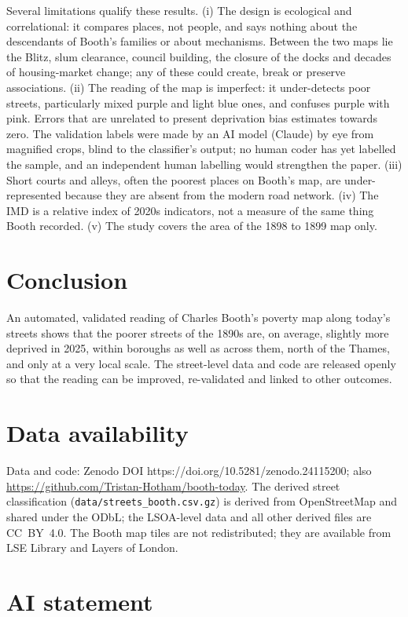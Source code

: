 Several limitations qualify these results. (i) The design is ecological and correlational: it compares places, not people, and says nothing about the descendants of Booth's families or about mechanisms. Between the two maps lie the Blitz, slum clearance, council building, the closure of the docks and decades of housing-market change; any of these could create, break or preserve associations. (ii) The reading of the map is imperfect: it under-detects poor streets, particularly mixed purple and light blue ones, and confuses purple with pink. Errors that are unrelated to present deprivation bias estimates towards zero. The validation labels were made by an AI model (Claude) by eye from magnified crops, blind to the classifier's output; no human coder has yet labelled the sample, and an independent human labelling would strengthen the paper. (iii) Short courts and alleys, often the poorest places on Booth's map, are under-represented because they are absent from the modern road network. (iv) The IMD is a relative index of 2020s indicators, not a measure of the same thing Booth recorded. (v) The study covers the area of the 1898 to 1899 map only.

\section{Conclusion}\label{sec:conclusion}

An automated, validated reading of Charles Booth's poverty map along today's streets shows that the poorer streets of the 1890s are, on average, slightly more deprived in 2025, within boroughs as well as across them, north of the Thames, and only at a very local scale. The street-level data and code are released openly so that the reading can be improved, re-validated and linked to other outcomes.

\section*{Data availability}
Data and code: Zenodo DOI https://doi.org/10.5281/zenodo.24115200; also \url{https://github.com/Tristan-Hotham/booth-today}. The derived street classification (\texttt{data/streets\_booth.csv.gz}) is derived from OpenStreetMap and shared under the ODbL; the LSOA-level data and all other derived files are CC~BY~4.0. The Booth map tiles are not redistributed; they are available from LSE Library and Layers of London.

\section*{AI statement}


